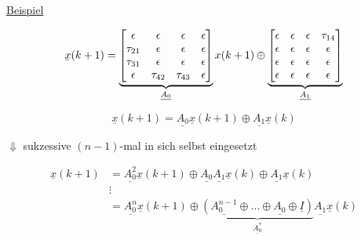 \underline{Beispiel}


\begin{equation}
	\ubar{x}(k+1) = 
	\underbrace{
		\m{
		\epsilon & \epsilon & \epsilon & \epsilon \\
		\tau_{21} & \epsilon & \epsilon & \epsilon \\
		\tau_{31} & \epsilon & \epsilon & \epsilon \\
		\epsilon & \tau_{42} & \tau_{43} & \epsilon \\
		}
	}_{\underline{A_0}}
	x(k+1) 
	\oplus
	\underbrace{
		\m{
			\epsilon & \epsilon & \epsilon & \tau_{14} \\
			\epsilon & \epsilon & \epsilon & \epsilon \\
			\epsilon & \epsilon & \epsilon & \epsilon \\
			\epsilon & \epsilon & \epsilon & \epsilon \\
		}
	}_{\underline{A_1}}
\end{equation}


\begin{equation}
	\underline{x}(k+1) = \underline{A_0} \underline{x}(k+1) \oplus \underline{A_1} \underline{x}(k)
\end{equation}

\begin{center}
	$\Downarrow$ sukzessive $(n-1)$-mal in sich selbst eingesetzt
\end{center}

\begin{align}
	\underline{x}(k+1) &= \underline{A_0^2} \underline{x}(k+1) 
	\oplus \underline{A_0} \underline{A_1} \underline{x}(k)
	\oplus \underline{A_1} \underline{x}(k) \\
	&\vdots\\
	&= \underline{A_0^n} \underline{x}(k+1) 
	\oplus \underbrace{\left( \underline{A_0^{n-1}} \oplus \ldots \oplus \underline{A_0} \oplus \underline{I} \right)}_{\underline{A_0^\ast}} \underline{A_1} \underline{x}(k)
\end{align}













